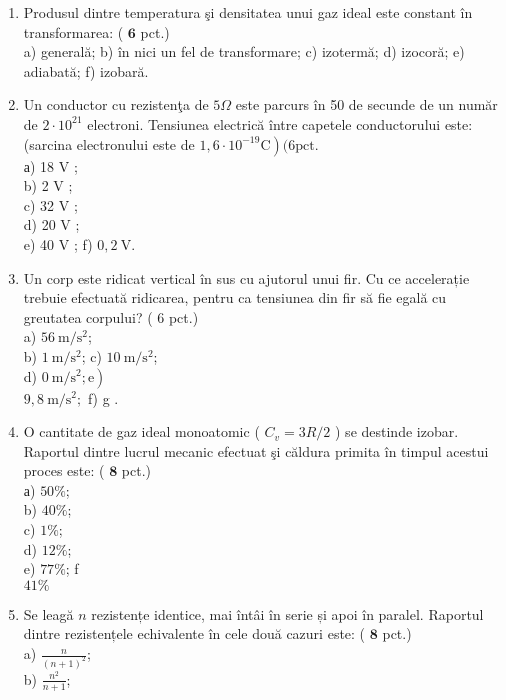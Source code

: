 
\begin{enumerate}
  \item Produsul dintre temperatura şi densitatea unui gaz ideal este constant în transformarea: ( $\mathbf{6}$ pct.)\\
a) generală; b) în nici un fel de transformare; c) izotermă; d) izocoră; e) adiabată; f) izobară.
  \item Un conductor cu rezistenţa de $5 \Omega$ este parcurs în 50 de secunde de un număr de $2 \cdot 10^{21}$ electroni. Tensiunea electrică între capetele conductorului este: (sarcina electronului este de $\left.1,6 \cdot 10^{-19} \mathrm{C}\right)(6 \mathrm{pct}$.\\
а) 18 V ;\\
b) 2 V ;\\
c) 32 V ;\\
d) 20 V ;\\
e) 40 V ; f) $0,2 \mathrm{~V}$.
  \item Un corp este ridicat vertical în sus cu ajutorul unui fir. Cu ce accelerație trebuie efectuată ridicarea, pentru ca tensiunea din fir să fie egală cu greutatea corpului? ( 6 pct.)\\
a) $56 \mathrm{~m} / \mathrm{s}^{2}$;\\
b) $1 \mathrm{~m} / \mathrm{s}^{2}$; c) $10 \mathrm{~m} / \mathrm{s}^{2}$;\\
d) $\left.0 \mathrm{~m} / \mathrm{s}^{2} ; \mathrm{e}\right)$\\
$9,8 \mathrm{~m} / \mathrm{s}^{2} ;$ f) g .
  \item O cantitate de gaz ideal monoatomic ( $C_{v}=3 R / 2$ ) se destinde izobar. Raportul dintre lucrul mecanic efectuat şi căldura primita în timpul acestui proces este: ( $\mathbf{8}$ pct.)\\
а) $50 \%$;\\
b) $40 \%$;\\
c) $1 \%$;\\
d) $12 \%$;\\
e) $77 \%$; f\\
$41 \%$
  \item Se leagă $n$ rezistențe identice, mai întâi în serie și apoi în paralel. Raportul dintre rezistențele echivalente în cele două cazuri este: ( $\mathbf{8}$ pct.)\\
a) $\frac{n}{(n+1)^{2}}$;\\
b) $\frac{n^{2}}{n+1}$;\\

\end{enumerate}
